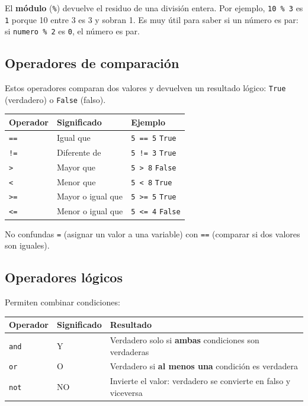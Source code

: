 \documentclass[11pt,a4paper]{article}
\begin{document}
\begin{cajaConcepto}
El \textbf{módulo} (\texttt{\%}) devuelve el residuo de una división entera. Por ejemplo, \texttt{10 \% 3} es \texttt{1} porque 10 entre 3 es 3 y sobran 1. Es muy útil para saber si un número es par: si \texttt{numero \% 2} es \texttt{0}, el número es par.
\end{cajaConcepto}

\subsection{Operadores de comparación}

Estos operadores comparan dos valores y devuelven un resultado lógico: \texttt{True} (verdadero) o \texttt{False} (falso).

\begin{table}[h]
\centering
\begin{tabularx}{\textwidth}{l l l}
\toprule
\textbf{Operador} & \textbf{Significado} & \textbf{Ejemplo} \\
\midrule
\texttt{==} & Igual que & \texttt{5 == 5} \textrightarrow{} \texttt{True} \\
\texttt{!=} & Diferente de & \texttt{5 != 3} \textrightarrow{} \texttt{True} \\
\texttt{>} & Mayor que & \texttt{5 > 8} \textrightarrow{} \texttt{False} \\
\texttt{<} & Menor que & \texttt{5 < 8} \textrightarrow{} \texttt{True} \\
\texttt{>=} & Mayor o igual que & \texttt{5 >= 5} \textrightarrow{} \texttt{True} \\
\texttt{<=} & Menor o igual que & \texttt{5 <= 4} \textrightarrow{} \texttt{False} \\
\bottomrule
\end{tabularx}
\end{table}

\begin{cajaRecuerda}
No confundas \texttt{=} (asignar un valor a una variable) con \texttt{==} (comparar si dos valores son iguales).
\end{cajaRecuerda}

\subsection{Operadores lógicos}

Permiten combinar condiciones:

\begin{table}[h]
\centering
\begin{tabularx}{\textwidth}{l l X}
\toprule
\textbf{Operador} & \textbf{Significado} & \textbf{Resultado} \\
\midrule
\texttt{and} & Y & Verdadero solo si \textbf{ambas} condiciones son verdaderas \\
\texttt{or} & O & Verdadero si \textbf{al menos una} condición es verdadera \\
\texttt{not} & NO & Invierte el valor: verdadero se convierte en falso y viceversa \\
\bottomrule
\end{tabularx}
\end{table}
\end{document}
